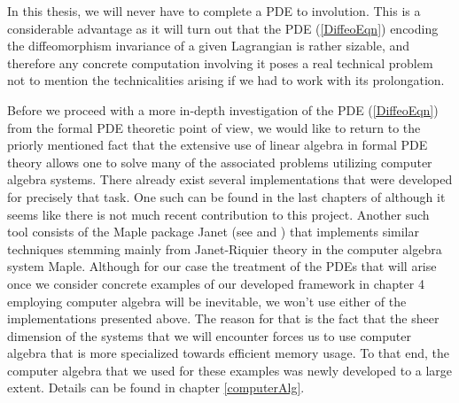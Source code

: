 In this thesis, we will never have to complete a PDE to involution. This is a considerable advantage as it will turn out that the PDE (\ref{DiffeoEqn}) encoding the diffeomorphism invariance of a given Lagrangian is rather sizable, and therefore any concrete computation involving it poses a real technical problem not to mention the technicalities arising if we had to work with its prolongation. 

Before we proceed with a more in-depth investigation of the PDE (\ref{DiffeoEqn}) from the formal PDE theoretic point of view, we would like to return to the priorly mentioned fact that the extensive use of linear algebra in formal PDE theory allows one to solve many of the associated problems utilizing computer algebra systems. There already exist several implementations that were developed for precisely that task. One such can be found in the last chapters of \cite{seiler1994analysis} although it seems like there is not much recent contribution to this project. Another such tool consists of the Maple package Janet (see \cite{Janet2} and \cite{Janet}) that implements similar techniques stemming mainly from Janet-Riquier theory in the computer algebra system Maple. 
Although for our case the treatment of the PDEs that will arise once we consider concrete examples of our developed framework in chapter 4 employing computer algebra will be inevitable, we won't use either of the implementations presented above. The reason for that is the fact that the sheer dimension of the systems that we will encounter forces us to use computer algebra that is more specialized towards efficient memory usage. To that end, the computer algebra that we used for these examples was newly developed to a large extent. Details can be found in chapter \ref{computerAlg}.    

